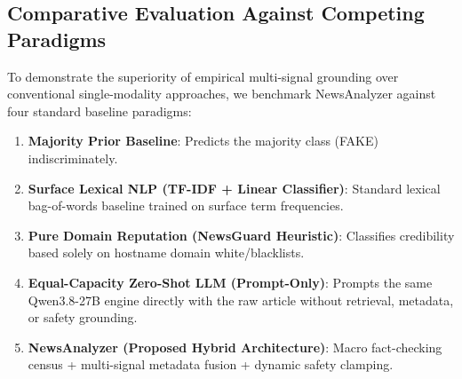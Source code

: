 \documentclass[twoside]{llncs}
\begin{document}
\subsection{Comparative Evaluation Against Competing Paradigms}
To demonstrate the superiority of empirical multi-signal grounding over conventional single-modality approaches, we benchmark NewsAnalyzer against four standard baseline paradigms:
\begin{enumerate}
  \item \textbf{Majority Prior Baseline}: Predicts the majority class (FAKE) indiscriminately.
  \item \textbf{Surface Lexical NLP (TF-IDF + Linear Classifier)}: Standard lexical bag-of-words baseline trained on surface term frequencies.
  \item \textbf{Pure Domain Reputation (NewsGuard Heuristic)}: Classifies credibility based solely on hostname domain white/blacklists.
  \item \textbf{Equal-Capacity Zero-Shot LLM (Prompt-Only)}: Prompts the same Qwen3.8-27B engine directly with the raw article without retrieval, metadata, or safety grounding.
  \item \textbf{NewsAnalyzer (Proposed Hybrid Architecture)}: Macro fact-checking census + multi-signal metadata fusion + dynamic safety clamping.
\end{enumerate}
\end{document}

